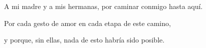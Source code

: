 \thispagestyle{empty}
\vspace*{\fill}
\begin{center}
A mi madre y a mis hermanas, por caminar conmigo hasta aquí.

Por cada gesto de amor en cada etapa de este camino,

y porque, sin ellas, nada de esto habría sido posible.
\end{center}
\vspace*{\fill}
